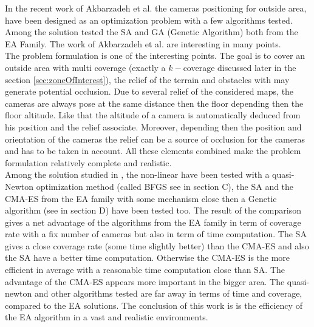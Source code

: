 In the recent work of Akbarzadeh et al. \cite{141*akbarzadeh2013} the cameras positioning for outside area, have been designed as an optimization problem with a few algorithms tested. Among the solution tested the SA and GA (Genetic Algorithm) both from the EA Family. 
The work of Akbarzadeh et al. \cite{141*akbarzadeh2013} are interesting in many points. \\
The problem formulation is one of the interesting points. The goal is to cover an outside area with  multi coverage (exactly a $k-$coverage  discussed later in the  section \ref{sec:zoneOfInterest}), the relief of the terrain and obstacles with may generate potential occlusion. 
Due to several relief of the considered maps, the cameras  are always pose at the same distance then the floor  depending then the floor altitude. Like that the altitude of a camera is automatically deduced from his position and the relief associate. Moreover, depending then the position and orientation of the cameras the relief can be a source of occlusion for the cameras and has to be taken in account.
All these elements combined make the problem formulation relatively complete and realistic.\\
 Among the solution studied in \cite{141*akbarzadeh2013}, the non-linear have been tested with a quasi-Newton optimization method (called BFGS see in \cite{141*akbarzadeh2013} section C), the SA and the CMA-ES  from the EA family with some mechanism close then a Genetic algorithm (see in \cite{141*akbarzadeh2013} section D) have been tested too.
The result of the comparison gives a net advantage of the algorithms from the EA family in term of coverage rate with a fix number of cameras but also in term of time computation. 
 The SA gives a close coverage rate (some time slightly better) than the CMA-ES and also the SA have a better time computation. Otherwise the CMA-ES is the more efficient in average with a reasonable time computation close than SA. The advantage of the CMA-ES appears more important in the bigger area. The quasi-newton and other algorithms tested are far away in terms of time and coverage, compared to the EA solutions.  The conclusion of this work \cite{141*akbarzadeh2013} is  is the efficiency of the EA algorithm in a vast and realistic environments.
 
